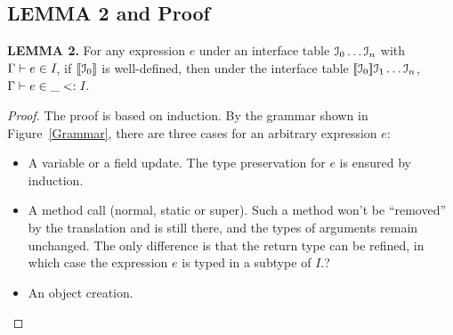 \subsection{LEMMA 2 and Proof}\label{subsec:proofs}
\textbf{LEMMA 2. }
For any expression $e$ under an interface table ${\cal{I}}_0\ldots{\cal{I}}_n$ with $\Gamma\vdash e\in\textit{I}$, if $[\![{\cal{I}}_0]\!]$ is well-defined, then under the interface table $[\![{\cal{I}}_0]\!]{\cal{I}}_1\ldots{\cal{I}}_n$, $\Gamma\vdash e\in\_<:\textit{I}$.
\begin{proof}
The proof is based on induction. By the grammar shown in Figure~\ref{Grammar}, there are three cases for an arbitrary expression $e$:
\begin{itemize}
\item A variable or a field update. The type preservation for $e$ is ensured by induction.
\item A method call (normal, static or super). Such a method won't be ``removed'' by the translation and is still there, and the types of arguments remain unchanged. The only difference is that the return type can be refined, in which case the expression $e$ is typed in a subtype of $I$.?
\item An object creation.
\end{itemize}
\end{proof}


